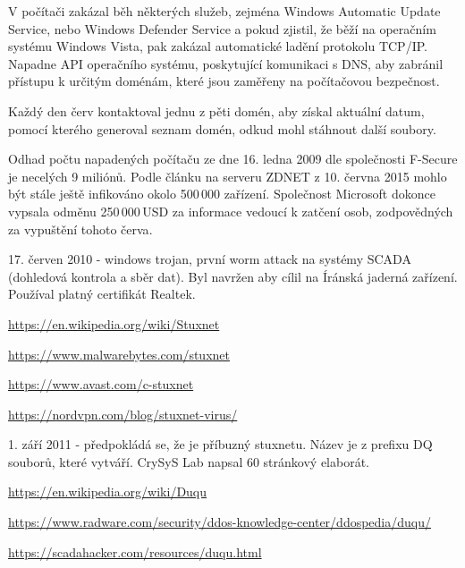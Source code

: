 \documentclass[a4paper,12pt]{article}
\begin{document}
V počítači zakázal běh některých služeb, zejména Windows Automatic Update Service, nebo Windows Defender Service a pokud zjistil, že běží na operačním systému Windows Vista, pak zakázal automatické ladění protokolu TCP/IP. Napadne API operačního systému, poskytující komunikaci s DNS, aby zabránil přístupu k určitým doménám, které jsou zaměřeny na počítačovou bezpečnost.\cite{conficker-fsecure}

Každý den červ kontaktoval jednu z pěti domén, aby získal aktuální datum, pomocí kterého generoval seznam domén, odkud mohl stáhnout další soubory.\cite{conficker-fsecure}

Odhad počtu napadených počítaču ze dne 16. ledna 2009 dle společnosti F-Secure je necelých 9 miliónů\cite{conficker-fsecure2}. Podle článku na serveru ZDNET z 10. června 2015 mohlo být stále ještě infikováno okolo 500\,000 zařízení. Společnost Microsoft dokonce vypsala odměnu 250\,000\,USD za informace vedoucí k zatčení osob, zodpovědných za vypuštění tohoto červa\cite{conficker-zdnet}.

17. červen 2010 - windows trojan, první worm attack na systémy SCADA (dohledová kontrola a sběr dat). Byl navržen aby cílil na Íránská jaderná zařízení. Používal platný certifikát Realtek.

\url{https://en.wikipedia.org/wiki/Stuxnet}

\url{https://www.malwarebytes.com/stuxnet}

\url{https://www.avast.com/c-stuxnet}

\url{https://nordvpn.com/blog/stuxnet-virus/}




1. září 2011 - předpokládá se, že je příbuzný stuxnetu. Název je z prefixu DQ souborů, které vytváří. CrySyS Lab napsal 60 stránkový elaborát.

\url{https://en.wikipedia.org/wiki/Duqu}

\url{https://www.radware.com/security/ddos-knowledge-center/ddospedia/duqu/}

\url{https://scadahacker.com/resources/duqu.html}

\end{document}
